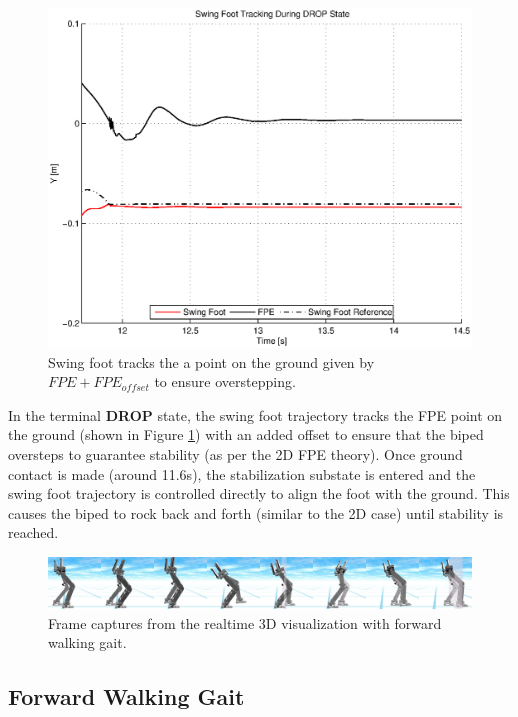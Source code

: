 \begin{figure}[!h]
	\centering
    \includegraphics[scale=0.7]{fig/simulations/sidefpetrack.eps}
  	\caption{Swing foot tracks the a point on the ground given by $FPE + FPE_{offset}$ to ensure overstepping.}
	\label{fig:sidefpetrack}
\end{figure}


In the terminal \textbf{DROP} state, the swing foot trajectory tracks the FPE point on the ground (shown in Figure \ref{fig:sidefpetrack}) with an added offset to ensure that the biped oversteps to guarantee stability (as per the 2D FPE theory). Once ground contact is made (around 11.6s), the stabilization substate is entered and the swing foot trajectory is controlled directly to align the foot with the ground. This causes the biped to rock back and forth (similar to the 2D case) until stability is reached.

\begin{figure}[!h]
	\centering
    \includegraphics[scale=0.1]{fig/simulations/fwdsequenceside.png}
  	\caption{Frame captures from the realtime 3D visualization with forward walking gait.}
	\label{fig:fwdsequenceside}
\end{figure}

\subsection{Forward Walking Gait} %
\label{sub:forward_walking_gait}

